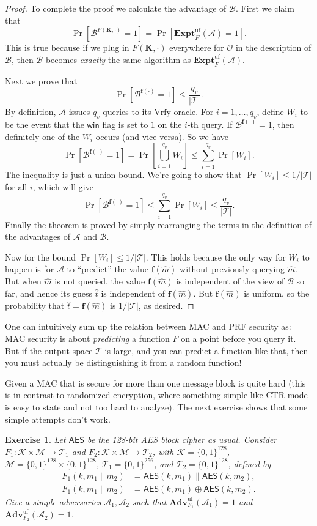 \documentclass[11pt]{article}
\newtheorem{exercise}{Exercise}
\newcommand{\msgs}{\mathcal{M}}
\newcommand{\keys}{\mathcal{K}}
\newcommand{\Vrfy}{\mathrm{Vrfy}}
\newcommand{\tags}{\mathcal{T}}
\newcommand{\win}{\mathsf{win}}
\newcommand{\calA}{\mathcal{A}}
\newcommand{\calB}{\mathcal{B}}
\newcommand{\AES}{\mathsf{AES}}
\newcommand{\calO}{\mathcal{O}}
\newcommand{\Adv}{\mathbf{Adv}}
\newcommand{\bits}{\{0,1\}}
\newcommand{\bK}{\mathbf{K}}
\newcommand{\bof}{\mathbf{f}}
\newcommand{\hatt}{\hat{t}}
\newcommand{\hatm}{\hat{m}}
\newcommand{\ExptUF}{\mathbf{Expt}^{\mathrm{uf}}}
\newcommand{\AdvUF}[2]{\Adv^{\mathrm{uf}}_{#1}({#2})}
\begin{document}
\begin{proof}
    To complete the proof we calculate the advantage of $\calB$. First we
    claim that
    \[
        \Pr[\calB^{F(\bK,\cdot)}=1] = \Pr[\ExptUF_F(\calA)=1].
    \]
    This is true because if we plug in $F(\bK,\cdot)$ everywhere for $\calO$ in
    the description of $\calB$, then $\calB$ becomes \emph{exactly} the same
    algorithm as $\ExptUF_F(\calA)$.
    
    Next we prove that
    \[
        \Pr[\calB^{\bof(\cdot)}=1] \leq \frac{q_v}{|\tags|}.
    \]
    By definition, $\calA$ issues $q_v$
    queries to its $\Vrfy$ oracle. For $i=1,\ldots,q_v$, define 
    $W_i$ to be the event that the $\win$ flag is set to $1$ on the $i$-th
    query. If $\calB^{\bof(\cdot)}=1$, then definitely one of the $W_i$
    occurs (and vice versa). So we have
    \[
        \Pr[\calB^{\bof(\cdot)}=1] = \Pr[\bigcup_{i=1}^{q_v} W_i] \leq
        \sum_{i=1}^{q_v}\Pr[W_i].
    \]
    The inequality is just a union bound. We're going to show that $\Pr[W_i]
    \leq 1/|\tags|$ for all $i$, which will give
    \[
        \Pr[\calB^{\bof(\cdot)}=1] \leq
        \sum_{i=1}^{q_v}\Pr[W_i] \leq \frac{q_v}{|\tags|}.
    \]
    Finally the theorem is proved by simply rearranging the terms in the
    definition of the advantages of $\calA$ and $\calB$.

    Now for the bound $\Pr[W_i]\leq 1/|\tags|$. This holds because the only way
    for $W_i$ to happen is for $\calA$ to ``predict'' the value $\bof(\hatm)$
    without previously querying $\hatm$. But when $\hatm$ is not queried, the
    value $\bof(\hatm)$ is independent of the view of $\calB$ so far, and hence
    its guess $\hatt$ is independent of $\bof(\hatm)$. But $\bof(\hatm)$ is
    uniform, so the probability that $\hatt = \bof(\hatm)$ is $1/|\tags|$, as
    desired.
\end{proof}
One can intuitively sum up the relation between MAC and PRF security as: MAC
security is about \emph{predicting} a function $F$ on a point before you query
it. But if the output space $\tags$ is large, and you can predict a function
like that, then you must actually be distinguishing it from a random function!

Given a MAC that is secure for more than one message block is quite hard
(this is in contrast to randomized encryption, where something simple like CTR
mode is easy to state and not too hard to analyze). The next exercise shows
that some simple attempts don't work.
\begin{exercise}
    Let $\AES$ be the 128-bit AES block cipher as usual. Consider
    $F_1:\keys\times\msgs\to\tags_1$ and $F_2:\keys\times\msgs\to\tags_2$, with
    $\keys = \bits^{128}$, $\msgs=\bits^{128}\times\bits^{128}$,
    $\tags_1=\bits^{256}$, and $\tags_2=\bits^{128}$, defined by
    \begin{align*}
        F_1(k,m_1\|m_2) & = \AES(k,m_1)\|\AES(k,m_2),\\
        F_1(k,m_1\|m_2) & = \AES(k,m_1)\oplus\AES(k,m_2).
    \end{align*}
    Give a simple adversaries $\calA_1,\calA_2$ such that 
    $\AdvUF{F_1}{\calA_1}=1$
    and 
    $\AdvUF{F_2}{\calA_2}=1$.
\end{exercise}
\end{document}
